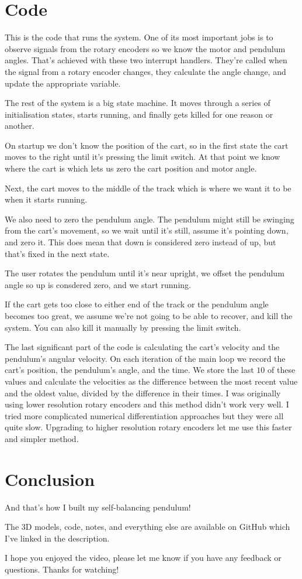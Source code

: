 \documentclass{article}
\begin{document}
\section{Code}

This is the code that runs the system. One of its most important jobs is to observe signals from the rotary encoders so we know the motor and pendulum angles. That's achieved with these two interrupt handlers. They're called when the signal from a rotary encoder changes, they calculate the angle change, and update the appropriate variable.

The rest of the system is a big state machine. It moves through a series of initialisation states, starts running, and finally gets killed for one reason or another.

On startup we don't know the position of the cart, so in the first state the cart moves to the right until it's pressing the limit switch. At that point we know where the cart is which lets us zero the cart position and motor angle.

Next, the cart moves to the middle of the track which is where we want it to be when it starts running.

We also need to zero the pendulum angle. The pendulum might still be swinging from the cart's movement, so we wait until it's still, assume it's pointing down, and zero it. This does mean that down is considered zero instead of up, but that's fixed in the next state.

The user rotates the pendulum until it's near upright, we offset the pendulum angle so up is consdered zero, and we start running.

If the cart gets too close to either end of the track or the pendulum angle becomes too great, we assume we're not going to be able to recover, and kill the system. You can also kill it manually by pressing the limit switch.

The last significant part of the code is calculating the cart's velocity and the pendulum's angular velocity. On each iteration of the main loop we record the cart's position, the pendulum's angle, and the time. We store the last $10$ of these values and calculate the velocities as the difference between the most recent value and the oldest value, divided by the difference in their times. I was originally using lower resolution rotary encoders and this method didn't work very well. I tried more complicated numerical differentiation approaches but they were all quite slow. Upgrading to higher resolution rotary encoders let me use this faster and simpler method.

\section{Conclusion}

And that's how I built my self-balancing pendulum!

The 3D models, code, notes, and everything else are available on GitHub which I've linked in the description.

I hope you enjoyed the video, please let me know if you have any feedback or questions. Thanks for watching!
\end{document}
